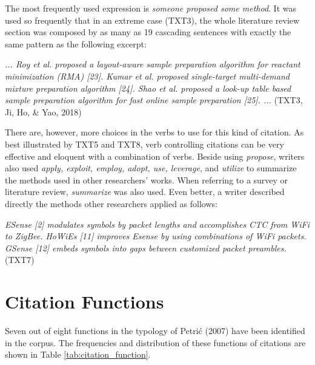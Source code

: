 The most frequently used expression is \textit{someone proposed some method}. It was used so frequently that in an extreme case (TXT3), the whole literature review section was composed by as many as 19 cascading sentences with exactly the same pattern as the following excerpt:

\textit{... Roy et al. proposed a layout-aware sample preparation algorithm for reactant minimization (RMA) [23]. Kumar et al. proposed single-target multi-demand mixture preparation algorithm [24]. Shao et al. proposed a look-up table based sample preparation algorithm for fast online sample preparation [25]. ...} (TXT3, Ji, Ho, \& Yao, 2018)

There are, however, more choices in the verbs to use for this kind of citation. As best illustrated by TXT5 and TXT8, verb controlling citations can be very effective and eloquent with a combination of verbs. Beside using \textit{propose}, writers also used \textit{apply, exploit, employ, adopt, use, leverage}, and \textit{utilize} to summarize the methods used in other researchers’ works. When referring to a survey or literature review, \textit{summarize} was also used. Even better, a writer described directly the methods other researchers applied as follows:

\textit{ESense [2] modulates symbols by packet lengths and accomplishes CTC from WiFi to ZigBee. HoWiEs [11] improves Esense by using combinations of WiFi packets. GSense [12] embeds symbols into gaps between customized packet preambles.} (TXT7)

\section{Citation Functions}
Seven out of eight functions in the typology of Petrić (2007) have been identified in the corpus. The frequencies and distribution of these functions of citations are shown in Table \ref{tab:citation_function}.


